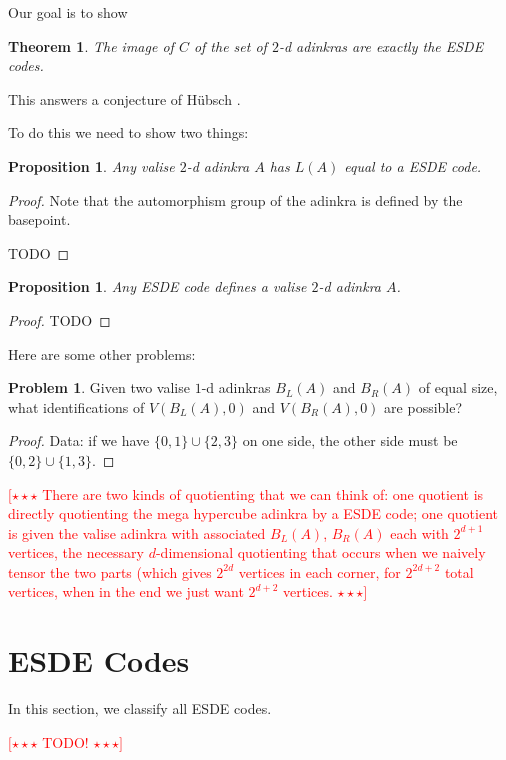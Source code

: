 \documentclass[12pt,twoside,singlespace]{article}
\numberwithin{equation}{section}
\newtheorem{thm}[equation]{Theorem}
\newtheorem{prop}[equation]{Proposition}
\theoremstyle{definition}
\newtheorem{prob}{Problem}
\newcommand{\com}[1]{\textcolor{red}{$[\star \star \star$ #1 $\star \star \star]$}}
\begin{document}
Our goal is to show
\begin{thm}
The image of $C$ of the set of $2$-d adinkras are exactly the ESDE codes.
\end{thm}

This answers a conjecture of H\"{u}bsch \cite{}.

To do this we need to show two things:

\begin{prop}
Any valise $2$-d adinkra $A$ has $L(A)$ equal to a ESDE code.
\end{prop}
\begin{proof}

Note that the automorphism group of the adinkra is defined by the basepoint.

TODO
\end{proof}

\begin{prop}
Any ESDE code defines a valise $2$-d adinkra $A$.
\end{prop}
\begin{proof}
TODO
\end{proof}

Here are some other problems:
\begin{prob}
Given two valise $1$-d adinkras $B_L(A)$ and $B_R(A)$ of equal size, what identifications of $V(B_L(A), 0)$ and $V(B_R(A), 0)$ are possible?
\end{prob}
\begin{proof}
Data: if we have $\{0,1\} \cup \{2,3\}$ on one side, the other side must be $\{0,2\} \cup \{1, 3\}$.
\end{proof}

\com{There are two kinds of quotienting that we can think of: one quotient is directly quotienting the mega hypercube adinkra by a ESDE code; one quotient is given the valise adinkra with associated $B_L(A)$, $B_R(A)$ each with $2^{d+1}$ vertices, the necessary $d$-dimensional quotienting that occurs when we naively tensor the two parts (which gives $2^{2d}$ vertices in each corner, for $2^{2d+2}$ total vertices, when in the end we just want $2^{d+2}$ vertices.}

\section{ESDE Codes}

In this section, we classify all ESDE codes.

\com{TODO!}
\end{document}
